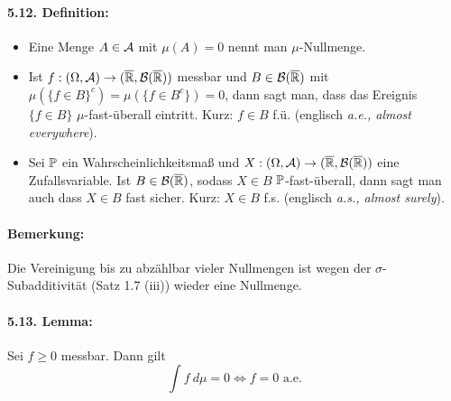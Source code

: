   \paragraph{5.12. Definition:}
  \begin{itemize}
      \item Eine Menge $A\in\mathcal{A}$ mit $\mu(A)=0$ nennt man $\mu$-Nullmenge.
      \item Ist $f:(\Omega,\mathcal{A})\to(\overline{\mathbb{R}},\mathcal{B}(\overline{\mathbb{R}}))$ messbar und $B\in\mathcal{B}(\overline{\mathbb{R}})$ mit $\mu\left(\{f\in B\}^c\right)=\mu(\{f\in B^c\})=0$, dann sagt man, dass das Ereignis $\{f\in B\}$ $\mu$-fast-\"uberall eintritt. Kurz: $f\in B$ f.\"u. (englisch \textit{a.e., almost everywhere}).
      \item Sei $\mathbb{P}$ ein Wahrscheinlichkeitsma\ss{} und $X:(\Omega,\mathcal{A})\to(\overline{\mathbb{R}},\mathcal{B}(\overline{\mathbb{R}}))$ eine Zufallsvariable. Ist $B\in\mathcal{B}(\overline{\mathbb{R}})$, sodass $X\in B$ $\mathbb{P}$-fast-\"uberall, dann sagt man auch dass $X\in B$ fast sicher. Kurz: $X\in B$ f.s. (englisch \textit{a.s., almost surely}).
  \end{itemize}
  
  \paragraph{Bemerkung:}Die Vereinigung bis zu abz\"ahlbar vieler Nullmengen ist wegen der $\sigma$-Subadditivit\"at (Satz 1.7 (iii)) wieder eine Nullmenge. 
  
  \paragraph{5.13. Lemma:}Sei $f\geq0$ messbar. Dann gilt
  $$\int f \ d\mu=0\iff f = 0\text{ a.e.}$$
  
